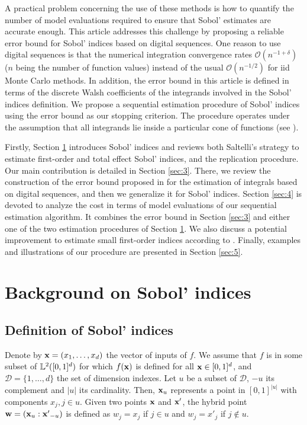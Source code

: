 A practical problem concerning the use of these methods is how to quantify the number of model evaluations required to ensure that Sobol' estimates are accurate enough. This article addresses this challenge by proposing a reliable error bound for Sobol' indices based on digital sequences. One reason to use digital sequences is that the numerical integration convergence rates  $\mathcal{O}(n^{-1+\delta})$ ($n$ being the number of function values) instead of the usual $\mathcal{O}(n^{-1/2})$ for iid Monte Carlo methods. In addition, the error bound in this article is defined in terms of the discrete Walsh coefficients of the integrands involved in the Sobol' indices definition. We propose a sequential estimation procedure of Sobol' indices using the error bound as our stopping criterion. The procedure operates under the assumption that all integrands lie inside a particular cone of functions (see \cite{HicJim}).

Firstly, Section \ref{sec:2} introduces Sobol' indices and reviews both Saltelli's strategy to estimate first-order and total effect Sobol' indices, and the replication procedure. Our main contribution is detailed in  Section \ref{sec:3}. There, we review the construction of the error bound proposed in \cite{HicJim} for the estimation of integrals based on digital sequences, and then we generalize it for Sobol' indices. Section \ref{sec:4} is devoted to analyze the cost in terms of model evaluations of our sequential estimation algorithm. It combines the error bound in Section \ref{sec:3} and either one of the two estimation procedures of Section \ref{sec:2}. We also discuss a potential improvement to estimate small first-order indices according to \cite{Owen}. Finally, examples and illustrations of our procedure are presented in Section \ref{sec:5}. 

\section{Background on Sobol' indices}
\label{sec:2}

\subsection{Definition of Sobol' indices}
\label{sec:2.1}
Denote by $\boldsymbol{\mathbf{x}}=(x_1,\dots,x_d)$ the vector of inputs of $f$. We assume that $f$ is in some subset of $\mathbb{L}^2([0,1]^d)$ for which $f(\boldsymbol{\mathbf{x}})$ is defined for all $\boldsymbol{\mathbf{x}}\in[0,1]^d$, and $\mathcal{D}=\{1,\dots,d\}$ the set of dimension indexes. %
Let $u$ be a subset of $\mathcal{D}$, $-u$ its complement and $|u|$ its cardinality. Then, $\boldsymbol{\mathbf{x}}_u$ represents a point in $[0,1]^{|u|}$ with components $x_j, j \in u$. Given two points $\boldsymbol{\mathbf{x}}$ and $\boldsymbol{\mathbf{x}}'$, the hybrid point $\boldsymbol{\mathbf{w}}=(\boldsymbol{\mathbf{x}}_u:{\boldsymbol{\mathbf{x}}'}_{-u})$ is defined as $w_j=x_j$ if $j \in u$ and $w_j=x'_j$ if $j \notin u$.%

